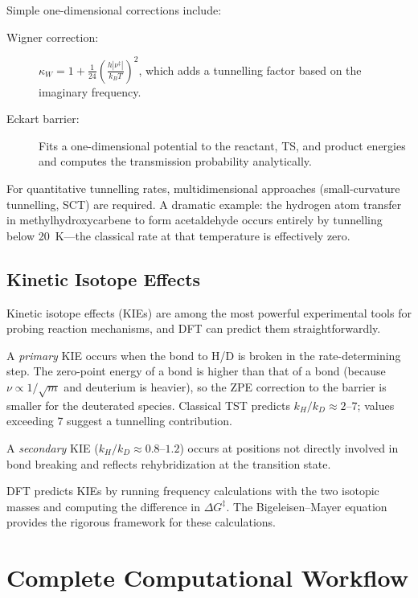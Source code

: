 \documentclass[11pt]{article}
\numberwithin{equation}{section}
\begin{document}
Simple one-dimensional corrections include:
\begin{description}
\item[Wigner correction:] $\kappa_W = 1 + \frac{1}{24}\left(\frac{h|\nu^\ddagger|}{k_BT}\right)^2$, which adds a tunnelling factor based on the imaginary frequency.
\item[Eckart barrier:] Fits a one-dimensional potential to the reactant, TS, and product energies and computes the transmission probability analytically.
\end{description}

For quantitative tunnelling rates, multidimensional approaches (small-curvature tunnelling, SCT) are required. A dramatic example: the hydrogen atom transfer in methylhydroxycarbene to form acetaldehyde occurs entirely by tunnelling below \SI{20}{K}---the classical rate at that temperature is effectively zero.

\subsection{Kinetic Isotope Effects}

Kinetic isotope effects (KIEs) are among the most powerful experimental tools for probing reaction mechanisms, and DFT can predict them straightforwardly.

A \emph{primary} KIE occurs when the bond to H/D is broken in the rate-determining step. The zero-point energy of a  bond is higher than that of a  bond (because $\nu \propto 1/\sqrt{m}$ and deuterium is heavier), so the ZPE correction to the barrier is smaller for the deuterated species. Classical TST predicts $k_H/k_D \approx 2$--$7$; values exceeding 7 suggest a tunnelling contribution.

A \emph{secondary} KIE ($k_H/k_D \approx 0.8$--$1.2$) occurs at positions not directly involved in bond breaking and reflects rehybridization at the transition state.

DFT predicts KIEs by running frequency calculations with the two isotopic masses and computing the difference in $\Delta G^\ddagger$. The Bigeleisen--Mayer equation provides the rigorous framework for these calculations.


\section{Complete Computational Workflow}
\label{sec:workflow}
\end{document}
